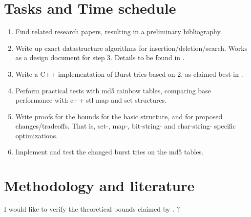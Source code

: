 \documentclass{article}
\begin{document}

\section*{Tasks and Time schedule}
\begin{enumerate}
    \item Find related research papers, resulting in a preliminary bibliography.
    \item Write up exact datastructure algorithms for insertion/deletion/search.
          Works as a design document for step 3. Details to be found in \cite{Heinz2002}.
    \item Write a C++ implementation of Burst tries based on 2, as claimed best in \cite{Nash2008}.
    \item Perform practical tests with md5 rainbow tables, comparing base performance
          with c++ stl map and set structures.
          
    \item Write proofs for the bounds for the basic structure, and for proposed
          changes/tradeoffs. That is, set-, map-, bit-string- and char-string-
          specific optimizations.
    \item Implement and test the changed burst tries on the md5 tables.
\end{enumerate}


\section*{Methodology and literature}

I would like to verify the theoretical bounds claimed by \cite{Nash2008}.
?
\nocite{Badr:2005, Dorji:2010}



\end{document}
